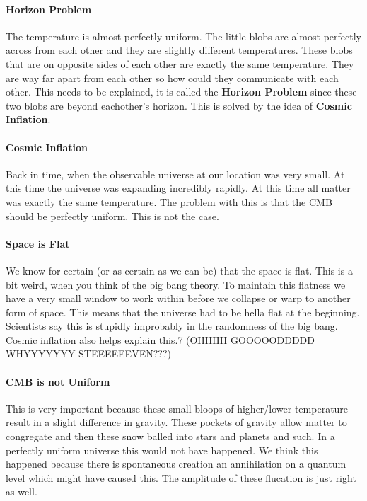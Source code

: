 \documentclass{article}
\begin{document}
\paragraph{Horizon Problem}
\label{par:horizon_problem}
The temperature is almost perfectly uniform. The little blobs are almost perfectly across from each other and they are slightly different temperatures. These blobs that are on opposite sides of each other are exactly the same temperature. They are way far apart from each other so how could they communicate with each other. This needs to be explained, it is called the \textbf{Horizon Problem} since these two blobs are beyond eachother's horizon. This is solved by the idea of \textbf{Cosmic Inflation}.

\paragraph{Cosmic Inflation}
\label{par:cosmic_inflation}
Back in time, when the observable universe at our location was very small. At this time the universe was expanding incredibly rapidly. At this time all matter was exactly the same temperature. The problem with this is that the CMB should be perfectly uniform. This is not the case.

\paragraph{Space is Flat}
\label{par:space_is_flat}
We know for certain (or as certain as we can be) that the space is flat. This is a bit weird, when you think of the big bang theory. To maintain this flatness we have a very small window to work within before we collapse or warp to another form of space. This means that the universe had to be hella flat at the beginning. Scientists say this is stupidly improbably in the randomness of the big bang. Cosmic inflation also helps explain this.7 (OHHHH GOOOOODDDDD WHYYYYYYY STEEEEEEVEN???)

\paragraph{CMB is not Uniform}
\label{par:cmb_is_not_uniform}
This is very important because these small bloops of higher/lower temperature result in a slight difference in gravity. These pockets of gravity allow matter to congregate and then these snow balled into stars and planets and such. In a perfectly uniform universe this would not have happened. We think this happened because there is spontaneous creation an annihilation on a quantum level which might have caused this. The amplitude of these flucation is just right as well.
\end{document}
